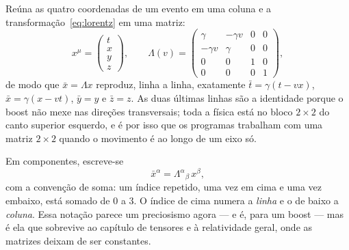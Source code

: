 \documentclass[12pt,a4paper,oneside]{book}
\theoremstyle{rgplain}
\theoremstyle{rgremark}
\begin{document}
Reúna as quatro coordenadas de um evento em uma coluna e a
transformação~\eqref{eq:lorentz} em uma matriz:
\begin{equation}
  x^\mu=\begin{pmatrix} t\\ x\\ y\\ z\end{pmatrix},
  \qquad
  \Lambda(v)=
  \begin{pmatrix}
    \gamma & -\gamma v & 0 & 0\\
    -\gamma v & \gamma & 0 & 0\\
    0 & 0 & 1 & 0\\
    0 & 0 & 0 & 1
  \end{pmatrix},
  \label{eq:boost-matriz}
\end{equation}
de modo que $\bar x=\Lambda x$ reproduz, linha a linha, exatamente
$\bar t=\gamma(t-vx)$, $\bar x=\gamma(x-vt)$, $\bar y=y$ e $\bar z=z$. As duas últimas linhas
são a identidade porque o boost não mexe nas direções transversais; toda a
física está no bloco $2\times2$ do canto superior esquerdo, e é por isso que os
programas trabalham com uma matriz $2\times2$ quando o movimento é ao longo de
um eixo só.

Em componentes, escreve-se
\begin{equation}
  \bar x^{\alpha}=\Lambda^{\alpha}{}_{\beta}\,x^{\beta},
  \label{eq:lorentz-indices}
\end{equation}
com a convenção de soma: um índice repetido, uma vez em cima e uma vez embaixo,
está somado de $0$ a $3$. O índice de cima numera a \emph{linha} e o de baixo a
\emph{coluna}. Essa notação parece um preciosismo agora --- e é, para um boost
--- mas é ela que sobrevive ao capítulo de tensores e à relatividade geral,
onde as matrizes deixam de ser constantes.
\end{document}
